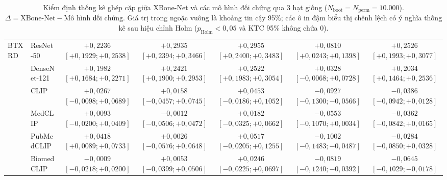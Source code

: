 \begin{table}[htbp]
{\begin{tabular}{|l|l|c|c|c|c|c|}
\multirow{6}{*}{BTXRD} & ResNet-50 & \textbf{$+0{,}2236$ \scriptsize$[+0{,}1929; +0{,}2538]$} & \textbf{$+0{,}2935$ \scriptsize$[+0{,}2394; +0{,}3466]$} & \textbf{$+0{,}2955$ \scriptsize$[+0{,}2400; +0{,}3483]$} & \textbf{$+0{,}0810$ \scriptsize$[+0{,}0243; +0{,}1398]$} & \textbf{$+0{,}2526$ \scriptsize$[+0{,}1993; +0{,}3077]$} \\ \cline{2-7}
 & DenseNet-121 & \textbf{$+0{,}1982$ \scriptsize$[+0{,}1684; +0{,}2271]$} & \textbf{$+0{,}2421$ \scriptsize$[+0{,}1900; +0{,}2953]$} & \textbf{$+0{,}2522$ \scriptsize$[+0{,}1983; +0{,}3054]$} & $+0{,}0328$ \scriptsize$[-0{,}0068; +0{,}0728]$ & \textbf{$+0{,}2034$ \scriptsize$[+0{,}1464; +0{,}2536]$} \\ \cline{2-7}
 & CLIP & $+0{,}0267$ \scriptsize$[-0{,}0098; +0{,}0689]$ & $+0{,}0158$ \scriptsize$[-0{,}0457; +0{,}0745]$ & $+0{,}0453$ \scriptsize$[-0{,}0186; +0{,}1052]$ & \textbf{$-0{,}0927$ \scriptsize$[-0{,}1300; -0{,}0566]$} & $-0{,}0386$ \scriptsize$[-0{,}0942; +0{,}0128]$ \\ \cline{2-7}
 & MedCLIP & $+0{,}0093$ \scriptsize$[-0{,}0200; +0{,}0409]$ & $-0{,}0012$ \scriptsize$[-0{,}0506; +0{,}0472]$ & $+0{,}0182$ \scriptsize$[-0{,}0325; +0{,}0662]$ & $-0{,}0553$ \scriptsize$[-0{,}1070; +0{,}0034]$ & $-0{,}0362$ \scriptsize$[-0{,}0842; +0{,}0165]$ \\ \cline{2-7}
 & PubMedCLIP & \textbf{$+0{,}0418$ \scriptsize$[+0{,}0089; +0{,}0733]$} & $+0{,}0026$ \scriptsize$[-0{,}0576; +0{,}0648]$ & $+0{,}0517$ \scriptsize$[-0{,}0205; +0{,}1255]$ & \textbf{$-0{,}1002$ \scriptsize$[-0{,}1483; -0{,}0487]$} & $-0{,}0284$ \scriptsize$[-0{,}0850; +0{,}0328]$ \\ \cline{2-7}
 & BiomedCLIP & $-0{,}0009$ \scriptsize$[-0{,}0218; +0{,}0200]$ & $+0{,}0053$ \scriptsize$[-0{,}0399; +0{,}0506]$ & $+0{,}0246$ \scriptsize$[-0{,}0225; +0{,}0697]$ & \textbf{$-0{,}0819$ \scriptsize$[-0{,}1240; -0{,}0392]$} & $-0{,}0645$ \scriptsize$[-0{,}1029; -0{,}0178]$ \\ \hline
\end{tabular}%
}
\caption{Kiểm định thống kê ghép cặp giữa XBone-Net và các mô hình đối chứng qua 3 hạt giống ($N_{\mathrm{boot}}=N_{\mathrm{perm}}=10.000$). $\Delta = \text{XBone-Net} - \text{Mô hình đối chứng}$. Giá trị trong ngoặc vuông là khoảng tin cậy 95\%; các ô in đậm biểu thị chênh lệch có ý nghĩa thống kê sau hiệu chỉnh Holm ($p_{\mathrm{Holm}} < 0{,}05$ và KTC 95\% không chứa 0).}
\label{tab:paired_baseline_statistics}
\end{table}
